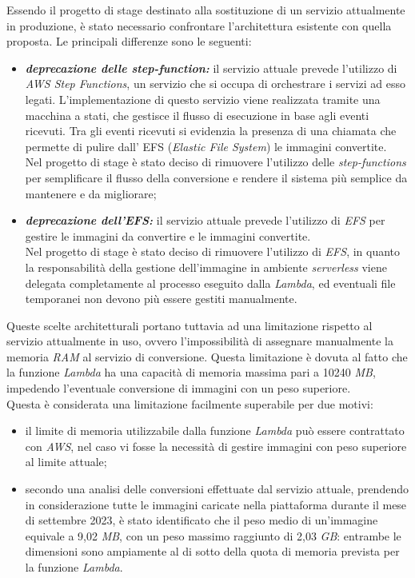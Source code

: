 Essendo il progetto di stage destinato alla sostituzione di un servizio
attualmente in produzione, è stato necessario confrontare l'architettura
esistente con quella proposta. Le principali differenze sono le seguenti:
\begin{itemize}
    \item \textbf{\emph{deprecazione delle step-function:}} il servizio attuale
          prevede l'utilizzo di \emph{AWS Step Functions}, un servizio che si occupa
          di orchestrare i servizi ad esso legati. L'implementazione di questo
          servizio viene realizzata tramite una macchina a stati, che gestisce il
          flusso di esecuzione in base agli eventi ricevuti. Tra gli eventi
          ricevuti si evidenzia la presenza di una chiamata che permette di
          pulire dall' \glsfirstoccur\gls{EFS} (\emph{Elastic File System}) le
          immagini convertite. \\
          Nel progetto di stage è stato deciso di rimuovere l'utilizzo delle
          \emph{step-functions} per semplificare il flusso della conversione e
          rendere il sistema più semplice da mantenere e da migliorare;
    \item \textbf{\emph{deprecazione dell'EFS:}} il servizio attuale prevede
          l'utilizzo di \emph{EFS} per gestire le immagini da convertire e le
          immagini convertite. \\
          Nel progetto di stage è stato deciso di rimuovere l'utilizzo di \emph{EFS}, in
          quanto la responsabilità della gestione dell'immagine in ambiente
          \emph{serverless} viene delegata completamente al processo eseguito
          dalla \emph{Lambda}, ed eventuali file temporanei non devono più
          essere gestiti manualmente.
\end{itemize}

Queste scelte architetturali portano tuttavia ad una limitazione rispetto al servizio
attualmente in uso, ovvero l'impossibilità di assegnare manualmente la memoria
\emph{RAM} al servizio di conversione. Questa limitazione è dovuta al fatto che
la funzione \emph{Lambda} ha una capacità di memoria massima pari a 10240
\emph{MB}, impedendo l'eventuale conversione di immagini con un peso
superiore.\\
Questa è considerata una limitazione facilmente superabile per due motivi:
\begin{itemize}
    \item il limite di memoria utilizzabile dalla funzione \emph{Lambda} può essere
          contrattato con \emph{AWS}, nel caso vi fosse la necessità di gestire immagini
          con peso superiore al limite attuale;
    \item secondo una analisi delle conversioni effettuate dal servizio attuale,
          prendendo in considerazione tutte le immagini caricate nella piattaforma
          durante il mese di settembre 2023, è stato identificato che il peso medio di
          un'immagine equivale a 9,02 \emph{MB}, con un peso massimo raggiunto di 2,03
          \emph{GB}: entrambe le dimensioni sono ampiamente al di sotto della quota di
          memoria prevista per la funzione \emph{Lambda}.
\end{itemize}


